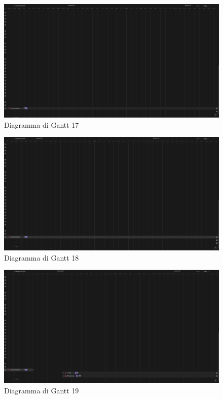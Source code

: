 \documentclass[12pt]{article}
\begin{document}
\begin{figure}[H]
    \includegraphics[width=\textwidth,keepaspectratio]{Immagini/Gantt/Iterazione 2/Gantt17.png}
        \caption{Diagramma di Gantt 17} 
        \label{fig:Gantt17}
\end{figure}

\begin{figure}[H]
    \includegraphics[width=\textwidth,keepaspectratio]{Immagini/Gantt/Iterazione 2/Gantt18.png}
        \caption{Diagramma di Gantt 18} 
        \label{fig:Gantt18}
\end{figure}

\begin{figure}[H]
    \includegraphics[width=\textwidth,keepaspectratio]{Immagini/Gantt/Iterazione 2/Gantt19.png}
        \caption{Diagramma di Gantt 19} 
        \label{fig:Gantt19}
\end{figure}
\end{document}
